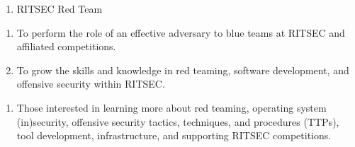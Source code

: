 

\begin{enumerate}
	\item RITSEC Red Team
\end{enumerate}


\begin{enumerate}
	\item To perform the role of an effective adversary to blue teams at RITSEC and
	      affiliated competitions.
	\item To grow the skills and knowledge in red teaming, software development, and
	      offensive security within RITSEC.\@
\end{enumerate}


\begin{enumerate}
	\item Those interested in learning more about red teaming, operating system
	      (in)security, offensive security tactics, techniques, and procedures (TTPs),
	      tool development, infrastructure, and supporting RITSEC competitions.
\end{enumerate}


